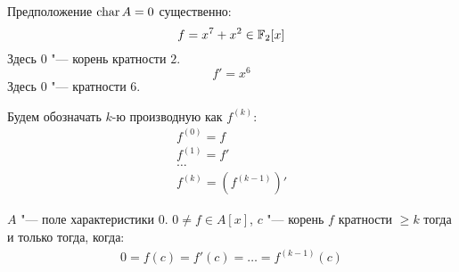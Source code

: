 \begin{Rem}
Предположение $\operatorname{char} A = 0$ существенно:
\[ f = x^7 + x^2 \in \mathbb{F}_2[x] \]
Здесь $0$ "--- корень кратности $2$.
\[ f' = x^6 \]
Здесь $0$ "--- кратности $6$.
\end{Rem}

\begin{Rem}
Будем обозначать $k$-ю производную как $f^{(k)}$:
\begin{gather*}
f^{(0)} = f \\
f^{(1)} = f' \\
\dots \\
f^{(k)} = (f^{(k - 1)})'
\end{gather*}
\end{Rem}
              
\begin{conseq}
$A$ "--- поле характеристики $0$. $0 \ne f \in A[x]$, $c$ "--- корень $f$ кратности $\ge k$ тогда и только тогда, когда:
\begin{gather*}
0 = f(c) = f'(c) = \ldots = f^{(k - 1)}(c) \\
\end{gather*}
\end{conseq}
